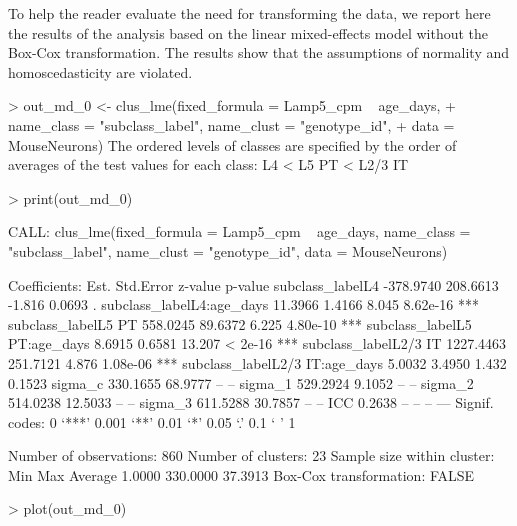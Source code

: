 To help the reader evaluate the need for transforming the data, we report here the results of the analysis based on the linear mixed-effects model without the Box-Cox transformation. The results show that the assumptions of normality and homoscedasticity are violated.

\begin{example}
> out_md_0 <- clus_lme(fixed_formula = Lamp5_cpm ~ age_days,
+                      name_class = "subclass_label", name_clust = "genotype_id",
+                      data = MouseNeurons)
The ordered levels of classes are specified by the order of 
 averages of the test values for each class:
L4 < L5 PT < L2/3 IT  
\end{example}

\begin{example}
> print(out_md_0)

CALL: clus_lme(fixed_formula = Lamp5_cpm ~ age_days, name_class = "subclass_label", 
    name_clust = "genotype_id", data = MouseNeurons)
 
Coefficients:
                                    Est. Std.Error z-value  p-value    
subclass_labelL4               -378.9740  208.6613  -1.816   0.0693 .  
subclass_labelL4:age_days        11.3966    1.4166   8.045 8.62e-16 ***
subclass_labelL5 PT             558.0245   89.6372   6.225 4.80e-10 ***
subclass_labelL5 PT:age_days      8.6915    0.6581  13.207  < 2e-16 ***
subclass_labelL2/3 IT          1227.4463  251.7121   4.876 1.08e-06 ***
subclass_labelL2/3 IT:age_days    5.0032    3.4950   1.432   0.1523    
sigma_c                         330.1655   68.9777      --       --    
sigma_1                         529.2924    9.1052      --       --    
sigma_2                         514.0238   12.5033      --       --    
sigma_3                         611.5288   30.7857      --       --    
ICC                               0.2638        --      --       --    
---
Signif. codes:  0 ‘***’ 0.001 ‘**’ 0.01 ‘*’ 0.05 ‘.’ 0.1 ‘ ’ 1

Number of observations: 860 
Number of clusters: 23 
Sample size within cluster:
     Min      Max  Average 
  1.0000 330.0000  37.3913 
Box-Cox transformation: FALSE 
\end{example}

\begin{example}
> plot(out_md_0)
\end{example}

